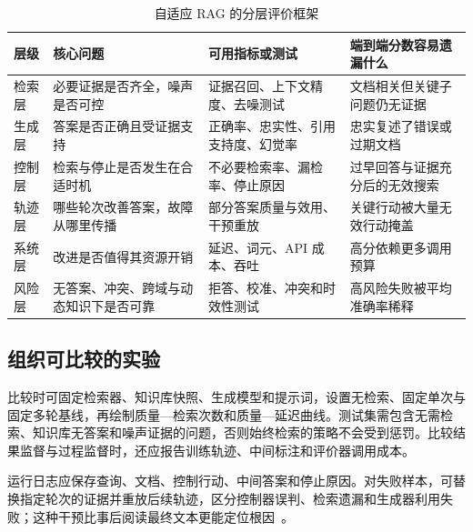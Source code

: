 \begin{table}[t]
\centering
\small
\caption{自适应 RAG 的分层评价框架}
\label{tab:evaluation}
\begin{tabularx}{\textwidth}{p{1.75cm}p{3.75cm}XX}
\toprule
层级 & 核心问题 & 可用指标或测试 & 端到端分数容易遗漏什么 \\
\midrule
检索层 & 必要证据是否齐全，噪声是否可控 & 证据召回、上下文精度、去噪测试 & 文档相关但关键子问题仍无证据 \\
生成层 & 答案是否正确且受证据支持 & 正确率、忠实性、引用支持度、幻觉率 & 忠实复述了错误或过期文档 \\
控制层 & 检索与停止是否发生在合适时机 & 不必要检索率、漏检率、停止原因 & 过早回答与证据充分后的无效搜索 \\
轨迹层 & 哪些轮次改善答案，故障从哪里传播 & 部分答案质量与效用、干预重放 & 关键行动被大量无效行动掩盖 \\
系统层 & 改进是否值得其资源开销 & 延迟、词元、API 成本、吞吐 & 高分依赖更多调用预算 \\
风险层 & 无答案、冲突、跨域与动态知识下是否可靠 & 拒答、校准、冲突和时效性测试 & 高风险失败被平均准确率稀释 \\
\bottomrule
\end{tabularx}
\end{table}

\subsection{组织可比较的实验}

比较时可固定检索器、知识库快照、生成模型和提示词，设置无检索、固定单次与固定多轮基线，再绘制质量—检索次数和质量—延迟曲线。测试集需包含无需检索、知识库无答案和噪声证据的问题，否则始终检索的策略不会受到惩罚。比较结果监督与过程监督时，还应报告训练轨迹、中间标注和评价器调用成本。

运行日志应保存查询、文档、控制行动、中间答案和停止原因。对失败样本，可替换指定轮次的证据并重放后续轨迹，区分控制器误判、检索遗漏和生成器利用失败；这种干预比事后阅读最终文本更能定位根因~\citep{pothuru2026failures}。
